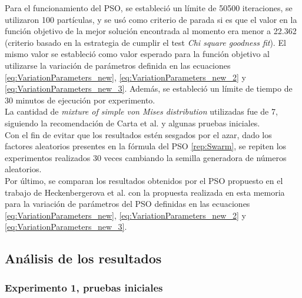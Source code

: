 Para el funcionamiento del PSO, se estableció un límite de 50500 iteraciones, se utilizaron 100 partículas, y se usó como criterio de parada si es que el valor en la función objetivo de la mejor solución encontrada al momento era menor a 22.362 (criterio basado en la estrategia de cumplir el test \emph{Chi square goodness fit}). El mismo valor se estableció como valor esperado para la función objetivo al utilizarse la variación de parámetros definida en las ecuaciones \ref{eq:VariationParameters_new},  \ref{eq:VariationParameters_new_2} y \ref{eq:VariationParameters_new_3}. Además, se estableció un límite de tiempo de 30 minutos de ejecución por experimento.\\
La cantidad de \emph{mixture of simple von Mises distribution} utilizadas fue de 7, siguiendo la recomendación de Carta et al. \cite{Carta07} y algunas pruebas iniciales.\\
Con el fin de evitar que los resultados estén sesgados por el azar, dado los factores aleatorios presentes en la fórmula del PSO 
\ref{rep:Swarm}, se repiten los experimentos realizados 30 veces cambiando la semilla generadora de números aleatorios.\\

Por último, se comparan los resultados obtenidos por el PSO propuesto en el trabajo de Heckenbergerova et al. \cite{Heckenbergerova15} con la propuesta realizada en esta memoria para la variación de parámetros del PSO definidas en las ecuaciones \ref{eq:VariationParameters_new}, \ref{eq:VariationParameters_new_2} y \ref{eq:VariationParameters_new_3}.

\subsection{Análisis de los resultados}
\subsubsection{Experimento 1, pruebas iniciales}

